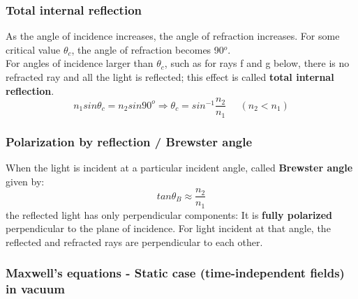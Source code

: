 \documentclass[english,11pt]{article}
\begin{document}
\subsubsection*{\bf Total internal reflection}
As the angle of incidence increases, the angle of refraction increases.
For some critical value $\theta_c$, the angle of refraction becomes 90$^o$.\\
\vspace{0.1cm}
For angles of incidence larger than $\theta_c$, such as for rays f and
g below, there is no refracted ray and all the light is reflected;
this effect is called {\bf total internal reflection}.\\
\begin{equation*}
       n_1 sin\theta_c = n_2 sin90^o \Rightarrow
       \theta_c = sin^{-1} \frac{n_2}{n_1} \;\;\;\;\;(n_2 < n_1)
\end{equation*}

\subsubsection*{\bf Polarization by reflection / Brewster angle}
When the light is incident at a particular incident angle, called {\bf Brewster angle}
given by:
\begin{equation*}
     tan\theta_B \approx \frac{n_2}{n_1}
 \end{equation*}
the reflected light has only perpendicular components: It is
{\bf fully polarized} perpendicular to the plane of incidence.
For light incident at that angle, the reflected and refracted rays are perpendicular to each other.

\subsubsection*{\bf Maxwell's equations - Static case (time-independent fields) in vacuum}
\end{document}
